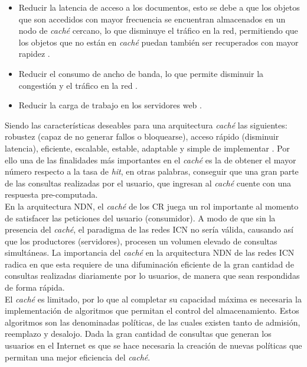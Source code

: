 \documentclass[12pt]{ociamthesis}  %
\begin{document}
\begin{itemize}
	
	\item Reducir la latencia de acceso a los documentos, esto se debe a que los objetos que son accedidos con mayor frecuencia se encuentran almacenados en un nodo de \textit{caché} cercano, lo que disminuye el tráfico en la red, permitiendo que los objetos que no están en \textit{caché} puedan también ser recuperados con mayor rapidez \cite{wang1999survey}.
	
	\item Reducir el consumo de ancho de banda, lo que permite disminuir la congestión y el tráfico en la red \cite{wang1999survey}.
	
	\item Reducir la carga de trabajo en los servidores web \cite{wang1999survey}.
	
\end{itemize}

Siendo las características deseables para una arquitectura \textit{caché} las siguientes: robustez (capaz de no generar fallos o bloquearse), acceso rápido (disminuir latencia), eficiente, escalable, estable, adaptable y simple de implementar \cite{wang1999survey}. Por ello una de las finalidades más importantes en el \textit{caché} es la de obtener el mayor número respecto a la tasa de \textit{hit}, en otras palabras, conseguir que una gran parte de las consultas realizadas por el usuario, que ingresan al \textit{caché} cuente con una respuesta pre-computada.\\

En la arquitectura NDN, el \textit{caché} de los CR juega un rol importante al momento de satisfacer las peticiones del usuario (consumidor). A modo de que sin la presencia del \textit{caché}, el paradigma de las redes ICN no sería válida, causando así que los productores (servidores), procesen un volumen elevado de consultas simultáneas. La importancia del \textit{caché} en la arquitectura NDN de las redes ICN radica en que esta requiere de una difuminación eficiente de la gran cantidad de consultas realizadas diariamente por lo usuarios, de manera que sean respondidas de forma rápida.\\

El \textit{caché} es limitado, por lo que al completar su capacidad máxima es necesaria la  implementación de algoritmos que permitan el control del almacenamiento. Estos algoritmos son las denominadas políticas, de las cuales existen tanto de admisión, reemplazo y desalojo. Dada la gran cantidad de consultas que generan los usuarios en el Internet es que se hace necesaria la creación de nuevas políticas que permitan una mejor eficiencia del \textit{caché}.\\
\end{document}

